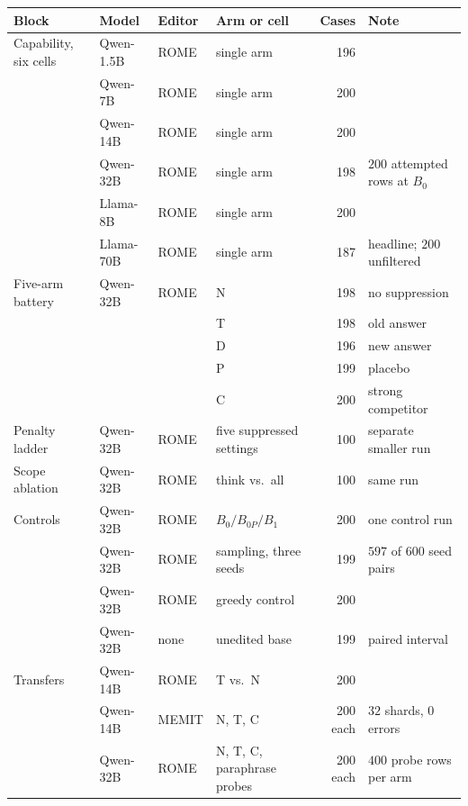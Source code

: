 \documentclass[letterpaper]{article}
\begin{document}
\begin{table}[t]
\centering
\small
\begin{tabular}{@{}llllrl@{}}
\toprule
Block & Model & Editor & Arm or cell & Cases & Note \\
\midrule
Capability, six cells & Qwen-1.5B  & ROME  & single arm & 196 & \\
                      & Qwen-7B    & ROME  & single arm & 200 & \\
                      & Qwen-14B   & ROME  & single arm & 200 & \\
                      & Qwen-32B   & ROME  & single arm & 198 & \(200\) attempted rows at \(B_0\) \\
                      & Llama-8B   & ROME  & single arm & 200 & \\
                      & Llama-70B  & ROME  & single arm & 187 & headline; \(200\) unfiltered \\
\addlinespace
Five-arm battery      & Qwen-32B   & ROME  & N & 198 & no suppression \\
                      &            &       & T & 198 & old answer \\
                      &            &       & D & 196 & new answer \\
                      &            &       & P & 199 & placebo \\
                      &            &       & C & 200 & strong competitor \\
\addlinespace
Penalty ladder        & Qwen-32B   & ROME  & five suppressed settings & 100 & separate smaller run \\
Scope ablation        & Qwen-32B   & ROME  & think vs.\ all & 100 & same run \\
\addlinespace
Controls              & Qwen-32B   & ROME  & \(B_0/B_{0P}/B_1\) & 200 & one control run \\
                      & Qwen-32B   & ROME  & sampling, three seeds & 199 & \(597\) of \(600\) seed pairs \\
                      & Qwen-32B   & ROME  & greedy control & 200 & \\
                      & Qwen-32B   & none  & unedited base & 199 & paired interval \\
\addlinespace
Transfers             & Qwen-14B   & ROME  & T vs.\ N & 200 & \\
                      & Qwen-14B   & MEMIT & N, T, C & 200 each & \(32\) shards, \(0\) errors \\
                      & Qwen-32B   & ROME  & N, T, C, paraphrase probes & 200 each & \(400\) probe rows per arm \\

\end{tabular}
\end{table}
\end{document}
